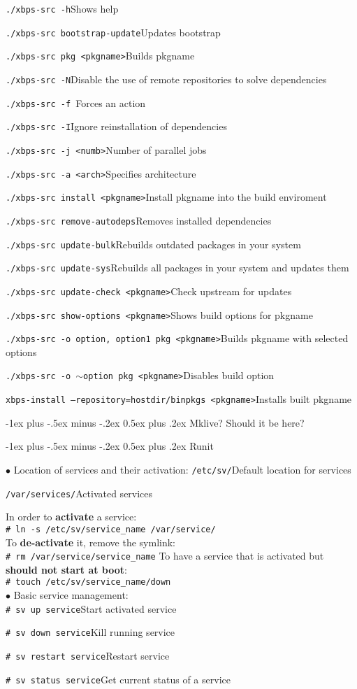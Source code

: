 \documentclass[12pt,landscape]{article}
\makeatletter
\renewcommand{\section}{\@startsection{section}{1}{0mm}%
                                {-1ex plus -.5ex minus -.2ex}%
                                {0.5ex plus .2ex}%
                                {\normalfont\large\bfseries}}
\def\cm#1#2{{\tt#1}\dotfill#2\par}
\makeatother
\begin{document}
\begin{multicols}{3}
	\cm{./xbps-src -h}{Shows help}
	\cm{./xbps-src bootstrap-update}{Updates bootstrap}
	\cm{./xbps-src pkg <pkgname>}{Builds pkgname}
	\cm{./xbps-src -N}{Disable the use of remote repositories to solve dependencies}
	\cm{./xbps-src -f }{Forces an action}
	\cm{./xbps-src -I}{Ignore reinstallation of dependencies}
	\cm{./xbps-src -j <numb>}{Number of parallel jobs}
	\cm{./xbps-src -a <arch>}{Specifies architecture}
	\cm{./xbps-src install <pkgname>}{Install pkgname into the build enviroment}
	\cm{./xbps-src remove-autodeps}{Removes installed dependencies}
	\cm{./xbps-src update-bulk}{Rebuilds outdated packages in your system}
	\cm{./xbps-src update-sys}{Rebuilds all packages in your system and updates them}
	\cm{./xbps-src update-check <pkgname>}{Check upstream for updates}
	\cm{./xbps-src show-options <pkgname>}{Shows build options for pkgname}
	\cm{./xbps-src -o option, option1 pkg <pkgname>}{Builds pkgname with selected options}
	\cm{./xbps-src -o $\sim$option pkg <pkgname>}{Disables build option}
	\cm{xbps-install --repository=hostdir/binpkgs <pkgname>}{Installs built pkgname}

\section{Mklive? Should it be here?}

\section{Runit}

$\bullet$ Location of services and their activation:
	\cm{/etc/sv/}{Default location for services}
	\cm{/var/services/}{Activated services}
	In order to \textbf{activate} a service: \\ \texttt{\# ln -s /etc/sv/service\_name /var/service/} \\
	To \textbf{de-activate} it, remove the symlink: \\ \texttt{\# rm /var/service/service\_name}
	To have a service that is activated but \textbf{should not start at boot}: \\
	\texttt{\# touch /etc/sv/service\_name/down} \\

$\bullet$ Basic service management: \\
	\cm{\# sv up service}{Start activated service}
	\cm{\# sv down service}{Kill running service}
	\cm{\# sv restart service}{Restart service}
	\cm{\# sv status service}{Get current status of a service}
	



\end{multicols}
\end{document}
